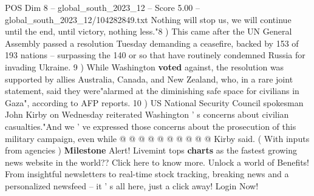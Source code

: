 \begin{textsample}{POS Dim 8 – global\_south\_2023\_12 – Score 5.00 – global\_south\_2023\_12/104282849.txt}
Nothing will stop us, we will continue until the end, until victory, nothing less."8 ) This came after the UN General Assembly passed a resolution Tuesday demanding a ceasefire, backed by 153 of 193 nations -- surpassing the 140 or so that have routinely condemned Russia for invading Ukraine. 9 ) While Washington \textbf{voted} against, the resolution was supported by allies Australia, Canada, and New Zealand, who, in a rare joint statement, said they were"alarmed at the diminishing safe space for civilians in Gaza", according to AFP reports. 10 ) US National Security Council spokesman John Kirby on Wednesday reiterated Washington ' s concerns about civilian casualties."And we ' ve expressed those concerns about the prosecution of this military campaign, even while @ @ @ @ @ @ @ @ @ @ Kirby said. ( With inputs from agencies ) \textbf{Milestone} Alert!
Livemint tops \textbf{charts} as the fastest growing news website in the world??
Click here to know more.
Unlock a world of Benefits!
From insightful newsletters to real-time stock tracking, breaking news and a personalized newsfeed -- it ' s all here, just a click away!
Login Now!

\end{textsample}
